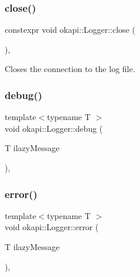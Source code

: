 \subsubsection{\texorpdfstring{close()}{close()}}
{\footnotesize\ttfamily constexpr void okapi\+::\+Logger\+::close (\begin{DoxyParamCaption}{ }\end{DoxyParamCaption})\hspace{0.3cm}{\ttfamily [inline]}, {\ttfamily [noexcept]}}

Closes the connection to the log file. \mbox{\label{classokapi_1_1Logger_a66cb0a59dbadc76f82b093bf99002bce}} 
\subsubsection{\texorpdfstring{debug()}{debug()}}
{\footnotesize\ttfamily template$<$typename T $>$ \\
void okapi\+::\+Logger\+::debug (\begin{DoxyParamCaption}\item[{T}]{ilazy\+Message }\end{DoxyParamCaption})\hspace{0.3cm}{\ttfamily [inline]}, {\ttfamily [noexcept]}}

\mbox{\label{classokapi_1_1Logger_a9be5bbf6b6e90265b37a955bebba4387}} 
\subsubsection{\texorpdfstring{error()}{error()}}
{\footnotesize\ttfamily template$<$typename T $>$ \\
void okapi\+::\+Logger\+::error (\begin{DoxyParamCaption}\item[{T}]{ilazy\+Message }\end{DoxyParamCaption})\hspace{0.3cm}{\ttfamily [inline]}, {\ttfamily [noexcept]}}

\mbox{\label{classokapi_1_1Logger_a5053cf778b4b55acba788a3797dc96d2}} 
